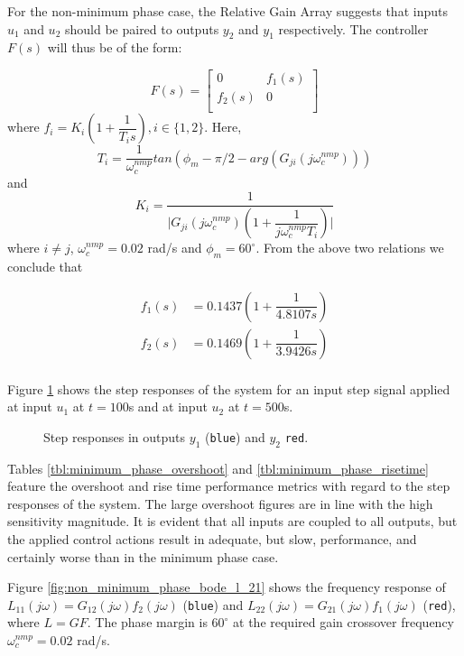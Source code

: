 For the non-minimum phase case, the Relative Gain Array suggests that inputs
$u_1$ and $u_2$ should be paired to outputs $y_2$ and $y_1$ respectively. The
controller $F(s)$ will thus be of the form:

\[
F(s)=
\begin{bmatrix}
  0      & f_1(s) \\
  f_2(s) & 0      \\
\end{bmatrix}
\]
where $f_i = K_i (1 + \dfrac{1}{T_i s}), i \in \{1,2\}$. Here,
$$T_i = \dfrac{1}{\omega_c^{nmp}} tan(\phi_m - \pi/2 - arg(G_{ji}(j\omega_c^{nmp})))$$
and
$$K_i = \dfrac{1}{\Big|G_{ji}(j\omega_c^{nmp}) (1 + \dfrac{1}{j\omega_c^{nmp}T_i})\Big|}$$
where $i \neq j$, $\omega_c^{nmp} = 0.02$ rad/s and $\phi_m = 60^{\circ}$. From
the above two relations we conclude that

\begin{align*}
  f_1(s) &= 0.1437 (1 + \dfrac{1}{4.8107s})  \\
  f_2(s) &= 0.1469 (1 + \dfrac{1}{3.9426s})  \\
\end{align*}

Figure \ref{fig:non_minimum_phase_step_23} shows the step responses of the
system for an input step signal applied at input $u_1$ at $t=100$s and at input
$u_2$ at $t=500$s.

\begin{figure}[H]\centering
  \scalebox{0.8}{}
  \caption{Step responses in outputs $y_1$ (\texttt{blue}) and $y_2$
    \texttt{red}.}
  \label{fig:non_minimum_phase_step_23}
\end{figure}

Tables \ref{tbl:minimum_phase_overshoot} and \ref{tbl:minimum_phase_risetime}
feature the overshoot and rise time performance metrics with regard to the
step responses of the system. The large overshoot figures are in line with the
high sensitivity magnitude. It is evident that all inputs are coupled to all
outputs, but the applied control actions result in adequate, but slow,
performance, and certainly worse than in the minimum phase case.

Figure \ref{fig:non_minimum_phase_bode_l_21} shows the frequency response of
$L_{11}(j\omega) = G_{12}(j\omega) f_2(j\omega)$ (\texttt{blue}) and
$L_{22}(j\omega) = G_{21}(j\omega) f_1(j\omega)$ (\texttt{red}), where $L = GF$.
The phase margin is $60^{\circ}$ at the required gain crossover frequency
$\omega_c^{nmp} = 0.02$ rad/s.

